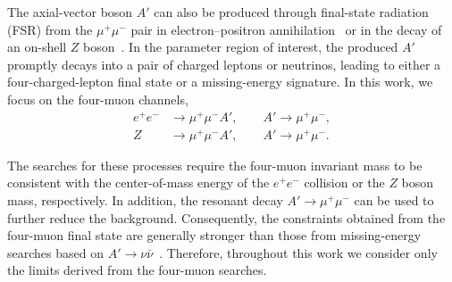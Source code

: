 \documentclass[onecolumn, aps, nofootinbib, prd, preprint, floats, floatfix, amsmath, amssymb, superscriptaddress, preprintnumbers]{revtex4-2}
\begin{document}
The axial-vector boson $A'$ can also be produced through final-state radiation (FSR) from the $\mu^+\mu^-$ pair in electron--positron annihilation~\cite{BaBar:2016sci, Belle-II:2022yaw, Belle-II:2024wtd} or in the decay of an on-shell $Z$ boson~\cite{Harigaya:2013twa, delAguila:2014soa, CMS:2018yxg}. In the parameter region of interest, the produced $A'$ promptly decays into a pair of charged leptons or neutrinos, leading to either a four-charged-lepton final state or a missing-energy signature. In this work, we focus on the four-muon channels,
\begin{equation}
	\begin{aligned}
		e^+e^- &\rightarrow \mu^+\mu^-A', \qquad A'\rightarrow \mu^+\mu^-,\\
		Z &\rightarrow \mu^+\mu^-A', \qquad A'\rightarrow \mu^+\mu^-.
	\end{aligned}
\end{equation}

The searches for these processes require the four-muon invariant mass to be consistent with the center-of-mass energy of the $e^+e^-$ collision or the $Z$ boson mass, respectively. In addition, the resonant decay $A'\to\mu^+\mu^-$ can be used to further reduce the background. Consequently, the constraints obtained from the four-muon final state are generally stronger than those from missing-energy searches based on $A'\rightarrow\nu\bar{\nu}$~\cite{Belle-II:2022yaw}. Therefore, throughout this work we consider only the limits derived from the four-muon searches.
\end{document}
